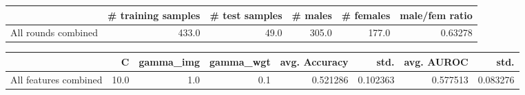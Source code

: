 \begin{tabular}{lrrrrr}
\hline
{} &  \# training samples &  \# test samples &  \# males &  \# females &  male/fem ratio \\
\hline
All rounds combined &               433.0 &            49.0 &    305.0 &      177.0 &         0.63278 \\
\hline
\end{tabular}
\begin{tabular}{lrrrrrrr}
\hline
{} &     C &  gamma\_img &  gamma\_wgt &  avg. Accuracy &      std. &  avg. AUROC &      std. \\
\hline
All features combined &  10.0 &        1.0 &        0.1 &       0.521286 &  0.102363 &    0.577513 &  0.083276 \\
\hline
\end{tabular}
